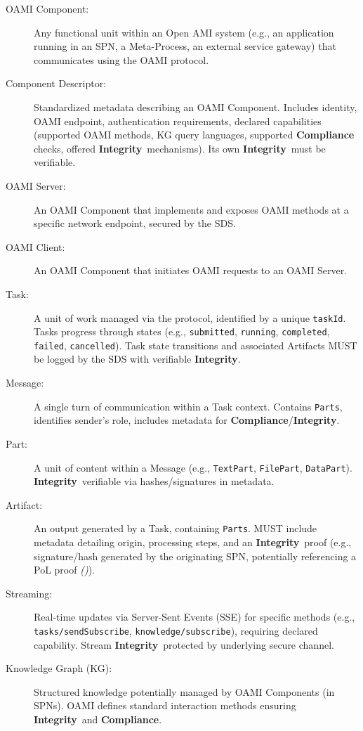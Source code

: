 \documentclass[12pt,a4paper]{report}
\renewcommand{\citep}[1]{\textit{\scriptsize{(\cite{#1})}}}
\newcommand{\Integrity}{\textbf{Integrity}}
\begin{document}
	\begin{description}
		\item[OAMI Component:] Any functional unit within an Open AMI system (e.g., an application running in an SPN, a Meta-Process, an external service gateway) that communicates using the OAMI protocol.
		\item[Component Descriptor:] Standardized metadata describing an OAMI Component. Includes identity, OAMI endpoint, authentication requirements, declared capabilities (supported OAMI methods, KG query languages, supported \textbf{Compliance} checks, offered \Integrity\ mechanisms). Its own \Integrity\ must be verifiable.
		\item[OAMI Server:] An OAMI Component that implements and exposes OAMI methods at a specific network endpoint, secured by the SDS.
		\item[OAMI Client:] An OAMI Component that initiates OAMI requests to an OAMI Server.
		\item[Task:] A unit of work managed via the protocol, identified by a unique \texttt{taskId}. Tasks progress through states (e.g., \texttt{submitted}, \texttt{running}, \texttt{completed}, \texttt{failed}, \texttt{cancelled}). Task state transitions and associated Artifacts MUST be logged by the SDS with verifiable \Integrity.
		\item[Message:] A single turn of communication within a Task context. Contains \texttt{Parts}, identifies sender's role, includes metadata for \textbf{Compliance}/\Integrity.
		\item[Part:] A unit of content within a Message (e.g., \texttt{TextPart}, \texttt{FilePart}, \texttt{DataPart}). \Integrity\ verifiable via hashes/signatures in metadata.
		\item[Artifact:] An output generated by a Task, containing \texttt{Parts}. MUST include metadata detailing origin, processing steps, and an \Integrity\ proof (e.g., signature/hash generated by the originating SPN, potentially referencing a PoL proof \citep{Jia2021ProofOfLearning}).
		\item[Streaming:] Real-time updates via Server-Sent Events (SSE) for specific methods (e.g., \texttt{tasks/sendSubscribe}, \texttt{knowledge/subscribe}), requiring declared capability. Stream \Integrity\ protected by underlying secure channel.
		\item[Knowledge Graph (KG):] Structured knowledge potentially managed by OAMI Components (in SPNs). OAMI defines standard interaction methods ensuring \Integrity\ and \textbf{Compliance}.
	\end{description}
	
\end{document}
